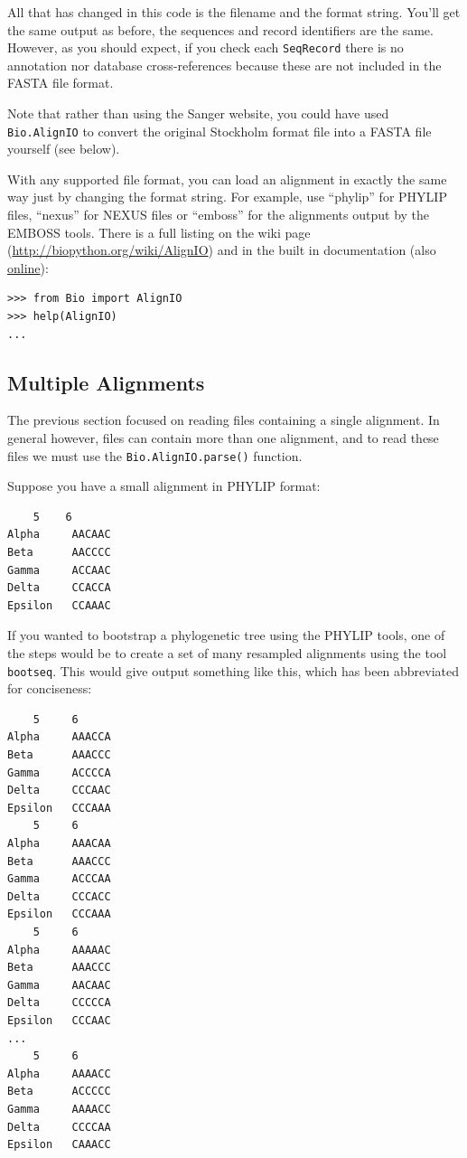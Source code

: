 \documentclass{report}
\begin{document}
All that has changed in this code is the filename and the format string.  You'll get the same output as before, the sequences and record identifiers are the same.
However, as you should expect, if you check each \verb|SeqRecord| there is no annotation nor database cross-references because these are not included in the FASTA file format.

Note that rather than using the Sanger website, you could have used \verb|Bio.AlignIO| to convert the original Stockholm format file into a FASTA file yourself (see below).

With any supported file format, you can load an alignment in exactly the same way just by changing the format string.  For example, use ``phylip'' for PHYLIP files, ``nexus'' for NEXUS files or ``emboss'' for the alignments output by the EMBOSS tools.  There is a full listing on the wiki page (\url{http://biopython.org/wiki/AlignIO}) and in the built in documentation (also \href{http://biopython.org/DIST/docs/api/Bio.AlignIO-module.html}{online}):

\begin{verbatim}
>>> from Bio import AlignIO
>>> help(AlignIO)
...
\end{verbatim}

\subsection{Multiple Alignments}

The previous section focused on reading files containing a single alignment.  In general however, files can contain more than one alignment, and to read these files we must use the \verb|Bio.AlignIO.parse()| function.

Suppose you have a small alignment in PHYLIP format:

\begin{verbatim}
    5    6
Alpha     AACAAC
Beta      AACCCC
Gamma     ACCAAC
Delta     CCACCA
Epsilon   CCAAAC
\end{verbatim}

If you wanted to bootstrap a phylogenetic tree using the PHYLIP tools, one of the steps would be to create a set of many resampled alignments using the tool \verb|bootseq|.  This would give output something like this, which has been abbreviated for conciseness:

\begin{verbatim}
    5     6
Alpha     AAACCA
Beta      AAACCC
Gamma     ACCCCA
Delta     CCCAAC
Epsilon   CCCAAA
    5     6
Alpha     AAACAA
Beta      AAACCC
Gamma     ACCCAA
Delta     CCCACC
Epsilon   CCCAAA
    5     6
Alpha     AAAAAC
Beta      AAACCC
Gamma     AACAAC
Delta     CCCCCA
Epsilon   CCCAAC
...
    5     6
Alpha     AAAACC
Beta      ACCCCC
Gamma     AAAACC
Delta     CCCCAA
Epsilon   CAAACC
\end{verbatim}
\end{document}
